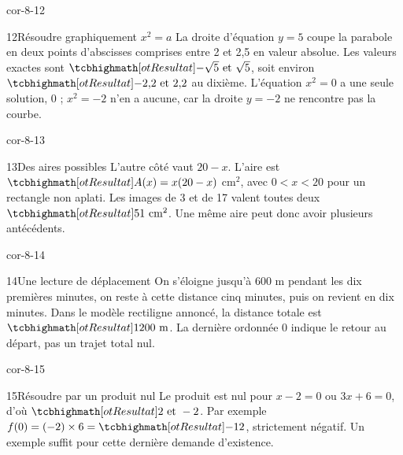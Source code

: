 \begin{blocLivre}{cor-8-12}\begin{corrige}{12}{Résoudre graphiquement $x^2=a$}
La droite d’équation $y=5$ coupe la parabole en deux points d’abscisses comprises entre 2 et 2,5 en valeur absolue. Les valeurs exactes sont $\res{-\sqrt5\text{ et }\sqrt5}$, soit environ $\res{-2{,}2\text{ et }2{,}2}$ au dixième. L’équation $x^2=0$ a une seule solution, 0 ; $x^2=-2$ n’en a aucune, car la droite $y=-2$ ne rencontre pas la courbe.
\label{fig-cor-8-12}
\end{corrige}\end{blocLivre}
\begin{blocLivre}{cor-8-13}\begin{corrige}{13}{Des aires possibles}
L’autre côté vaut $20-x$. L’aire est $\res{A(x)=x(20-x)}$ cm$^2$, avec $0<x<20$ pour un rectangle non aplati. Les images de 3 et de 17 valent toutes deux $\res{51\text{ cm}^2}$. Une même aire peut donc avoir plusieurs antécédents.
\label{fig-cor-8-13}
\end{corrige}\end{blocLivre}
\begin{blocLivre}{cor-8-14}\begin{corrige}{14}{Une lecture de déplacement}
On s’éloigne jusqu’à 600 m pendant les dix premières minutes, on reste à cette distance cinq minutes, puis on revient en dix minutes. Dans le modèle rectiligne annoncé, la distance totale est $\res{1200\text{ m}}$. La dernière ordonnée 0 indique le retour au départ, pas un trajet total nul.
\label{fig-cor-8-14}
\end{corrige}\end{blocLivre}
\begin{blocLivre}{cor-8-15}\begin{corrige}{15}{Résoudre par un produit nul}
Le produit est nul pour $x-2=0$ ou $3x+6=0$, d’où $\res{2\text{ et }-2}$. Par exemple $f(0)=(-2)\times6=\res{-12}$, strictement négatif. Un exemple suffit pour cette dernière demande d’existence.
\end{corrige}\end{blocLivre}
